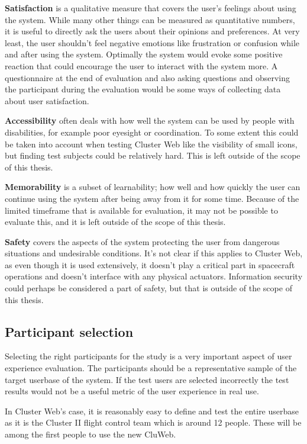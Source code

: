 \textbf{Satisfaction} is a qualitative measure that covers the user's feelings about using the system. While many other things can be measured as quantitative numbers, it is useful to directly ask the users about their opinions and preferences. At very least, the user shouldn't feel negative emotions like frustration or confusion while and after using the system. Optimally the system would evoke some positive reaction that could encourage the user to interact with the system more. A questionnaire at the end of evaluation and also asking questions and observing the participant during the evaluation would be some ways of collecting data about user satisfaction.

\textbf{Accessibility} often deals with how well the system can be used by people with disabilities, for example poor eyesight or coordination. To some extent this could be taken into account when testing Cluster Web like the visibility of small icons, but finding test subjects could be relatively hard. This is left outside of the scope of this thesis.

\textbf{Memorability} is  a subset of learnability; how well and how quickly the user can continue using the system after being away from it for some time. Because of the limited timeframe that is available for evaluation, it may not be possible to evaluate this, and it is left outside of the scope of this thesis.

\textbf{Safety} covers the aspects of the system protecting the user from dangerous situations and undesirable conditions. It's not clear if this applies to Cluster Web, as even though it is used extensively, it doesn't play a critical part in spacecraft operations and doesn't interface with any physical actuators. Information security could perhaps be considered a part of safety, but that is outside of the scope of this thesis.

\cite{rubin2008handbook, bevanevaluation, albert2013measuring}

\subsection{Participant selection}
Selecting the right participants for the study is a very important aspect of user experience evaluation. The participants should be a representative sample of the target userbase of the system. If the test users are selected incorrectly the test results would not be a useful metric of the user experience in real use.

In Cluster Web's case, it is reasonably easy to  define and test the entire userbase as it is the Cluster II flight control team which is around 12 people. These will be among the first people to use the new CluWeb.

